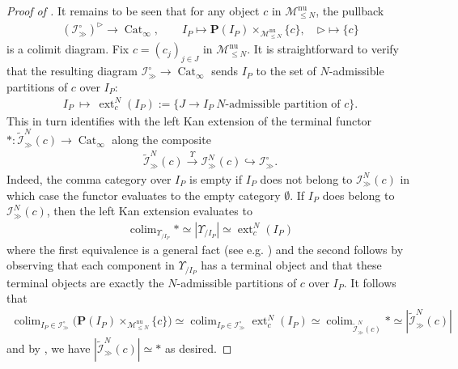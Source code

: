 \documentclass[12pt, reqno]{amsart}
\theoremstyle{plain}
\theoremstyle{definition}
\begin{document}
\begin{proof}[Proof of ]
It remains to be seen that for any object $c$ in $\mathscr{M}_{\leq N}^{\operatorname{nu}}$, the pullback
\begin{align*}
(\mathcal{I}^\circ_\gg)^\triangleright \rightarrow \operatorname{Cat}_\infty,\qquad I_P\mapsto \mathbf{P}(I_P)\mathop{\times}_{\mathscr{M}_{\leq N}^{\operatorname{nu}}} \{c\},\quad \triangleright \mapsto \{c\}
\end{align*}
is a colimit diagram. Fix $c=(c_j)_{j\in J}$ in $\mathscr{M}_{\leq N}^{\operatorname{nu}}$. It is straightforward to verify that the resulting diagram $\mathcal{I}^\circ_\gg\rightarrow \operatorname{Cat}_\infty$ sends $I_P$ to the set of $N$-admissible partitions of $c$ over $I_P$:
\begin{align*}
I_P\ \mapsto\ \operatorname{ext}_c^N(I_P):=\{J\rightarrow I_P \ N\text{-admissible partition of }c\}.
\end{align*}
This in turn identifies with the left Kan extension of the terminal functor $\ast\colon \widetilde{\mathcal{I}}^N_\gg(c)\rightarrow \operatorname{Cat}_\infty$ along the composite
\begin{align*}
\widetilde{\mathcal{I}}^N_\gg(c)\xrightarrow{\Upsilon} \mathcal{I}^N_\gg(c)\hookrightarrow \mathcal{I}^\circ_\gg.
\end{align*}
Indeed, the comma category over $I_P$ is empty if $I_P$ does not belong to $\mathcal{I}^N_\gg(c)$ in which case the functor evaluates to the empty category $\emptyset$. If $I_P$ does belong to $\mathcal{I}^N_\gg(c)$, then the left Kan extension evaluates to
\begin{align*}
\mathop{\operatorname{colim}}_{\Upsilon_{/I_P}}\ast \simeq |\Upsilon_{/I_P}|\simeq \operatorname{ext}_c^N(I_P)
\end{align*} 
where the first equivalence is a general fact (see e.g. \cite[Corollary 2.10 (4)]{ClausenOrsnesJansen}) and the second follows by observing that each component in $\Upsilon_{/I_P}$ has a terminal object and that these terminal objects are exactly the $N$-admissible partitions of $c$ over $I_P$. It follows that
\begin{align*}
\mathop{\operatorname{colim}}_{I_P\in \mathcal{I}^\circ_\gg} \big(\mathbf{P}(I_P)\mathop{\times}_{\mathscr{M}_{\leq N}^{\operatorname{nu}}} \{c\}\big)\simeq \mathop{\operatorname{colim}}_{I_P\in \mathcal{I}^\circ_\gg}\operatorname{ext}_c^N(I_P) \simeq \mathop{\operatorname{colim}}_{\widetilde{\mathcal{I}}^N_\gg(c)}\ast \simeq |\widetilde{\mathcal{I}}^N_\gg(c)|
\end{align*}
and by , we have $|\widetilde{\mathcal{I}}^N_\gg(c)|\simeq \ast$ as desired.


\end{proof}
\end{document}
